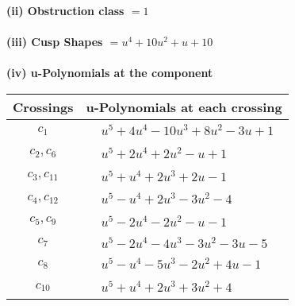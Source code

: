 \documentclass[1p]{elsarticle_modified}
\theoremstyle{definition}
\begin{document}
\flushleft \textbf{(ii) Obstruction class $= 1$}\\~\\
\flushleft \textbf{(iii) Cusp Shapes $= u^4+10 u^2+u+10$}\\~\\
\newpage\renewcommand{\arraystretch}{1}
\flushleft \textbf{(iv) u-Polynomials at the component}\newline \\
\begin{tabular}{m{50pt}|m{274pt}}
Crossings & \hspace{64pt}u-Polynomials at each crossing \\
\hline $$\begin{aligned}c_{1}\end{aligned}$$&$\begin{aligned}
&u^5+4 u^4-10 u^3+8 u^2-3 u+1
\end{aligned}$\\
\hline $$\begin{aligned}c_{2},c_{6}\end{aligned}$$&$\begin{aligned}
&u^5+2 u^4+2 u^2- u+1
\end{aligned}$\\
\hline $$\begin{aligned}c_{3},c_{11}\end{aligned}$$&$\begin{aligned}
&u^5+u^4+2 u^3+2 u-1
\end{aligned}$\\
\hline $$\begin{aligned}c_{4},c_{12}\end{aligned}$$&$\begin{aligned}
&u^5- u^4+2 u^3-3 u^2-4
\end{aligned}$\\
\hline $$\begin{aligned}c_{5},c_{9}\end{aligned}$$&$\begin{aligned}
&u^5-2 u^4-2 u^2- u-1
\end{aligned}$\\
\hline $$\begin{aligned}c_{7}\end{aligned}$$&$\begin{aligned}
&u^5-2 u^4-4 u^3-3 u^2-3 u-5
\end{aligned}$\\
\hline $$\begin{aligned}c_{8}\end{aligned}$$&$\begin{aligned}
&u^5- u^4-5 u^3-2 u^2+4 u-1
\end{aligned}$\\
\hline $$\begin{aligned}c_{10}\end{aligned}$$&$\begin{aligned}
&u^5+u^4+2 u^3+3 u^2+4
\end{aligned}$\\
\hline
\end{tabular}\\~\\
\end{document}
